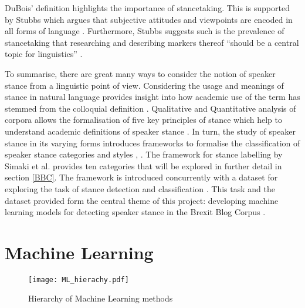 \documentclass[Dissertation.tex]{subfiles}
\begin{document}
DuBois' \cite{duboisStanceTriangle2007} definition highlights the importance of stancetaking. This is supported by Stubbs  which argues that subjective attitudes and viewpoints are encoded in all forms of language \cite{stubbsMatterProlongedField1986}. Furthermore, Stubbs suggests such is the prevalence of stancetaking that researching and describing markers thereof ``should be  a  central
topic for linguistics'' \cite{stubbsMatterProlongedField1986}.

To summarise, there are great many ways to consider the notion of speaker stance from a linguistic point of view. Considering the usage and meanings of stance in natural language provides insight into how academic use of the term has stemmed from the colloquial definition \cite{barlowUsagebasedModelsLanguage2000}. Qualitative and Quantitative analysis of corpora allows the formalisation of five key principles of stance which help to understand academic definitions of speaker stance \cite{englebretsonStancetakingDiscourseSubjectivity2007}. In turn, the study of speaker stance in its varying forms introduces frameworks to formalise the classification of speaker stance categories and styles \cite{biberStylesStanceEnglish1989}, \cite{simakiAnnotatingSpeakerStance2017}. The framework for stance labelling by Simaki et al. \cite{simakiAnnotatingSpeakerStance2017} provides ten categories that will be explored in further detail in section \ref{BBC}. The framework is introduced concurrently with a dataset for exploring the task of stance detection and classification \cite{simakiAnnotatingSpeakerStance2017}. This task and the dataset provided form the central theme of this project: developing machine learning models for detecting speaker stance in the Brexit Blog Corpus \cite{simakiAnnotatingSpeakerStance2017}.
\section{Machine Learning}

\begin{figure}
	\centering
	\texttt{[image: ML\_hierachy.pdf]}
	\caption{Hierarchy of Machine Learning methods}
	\label{mlHierachy}
\end{figure}
\end{document}
